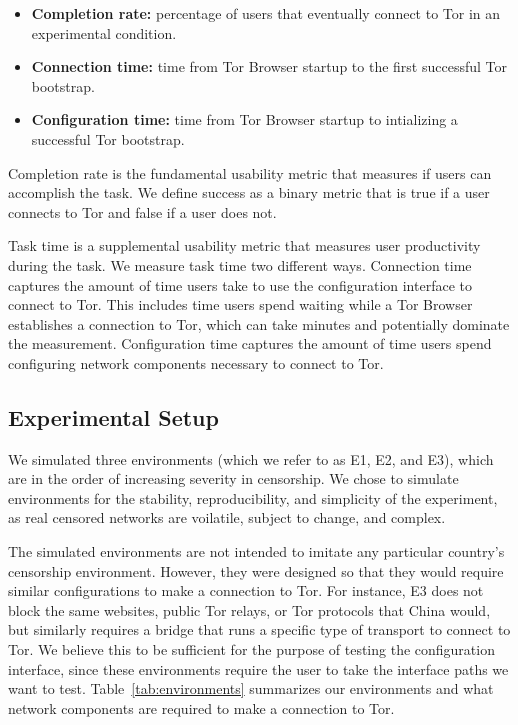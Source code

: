 \documentclass[USenglish,oneside,twocolumn]{article}
\begin{document}
\begin{itemize}
\item {\bfseries Completion rate:}  percentage of users that eventually connect to Tor in an experimental condition. 
\item {\bfseries Connection time:} time from Tor Browser startup to the first successful Tor bootstrap. 
\item {\bfseries Configuration time:} time from Tor Browser startup to intializing a successful Tor bootstrap.
\end{itemize}

Completion rate is the fundamental usability metric that measures if users can accomplish the task. We define success as a binary metric that is true if a user connects to Tor and false if a user does not. 

Task time is a supplemental usability metric that measures user productivity during the task. We measure task time two different ways. Connection time captures the amount of time users take to use the configuration interface to connect to Tor. This includes time users spend waiting while a Tor Browser establishes a connection to Tor, which can take minutes and potentially dominate the measurement. Configuration time captures the amount of time users spend configuring network components necessary to connect to Tor. 

\subsection{Experimental Setup}
We simulated three environments (which we refer to as E1, E2, and E3), 
which are in the order of increasing severity in censorship. We chose to 
simulate environments for the stability, reproducibility, and simplicity of the 
experiment, as real censored networks are voilatile, subject to change, and complex. 

The simulated environments are not intended to imitate any particular country's censorship environment. However, they were designed so that they would require similar configurations
to make a connection to Tor. For instance, E3 does not block the same websites, public Tor relays, or Tor protocols that China would, but similarly requires a bridge that runs a specific type of transport to connect to Tor. We believe this to be sufficient for the purpose of testing the configuration interface, since these environments require the user to take the interface paths we want to test. Table~\ref{tab:environments} summarizes our
environments and what network components are required to make a 
connection to Tor. 
\end{document}
